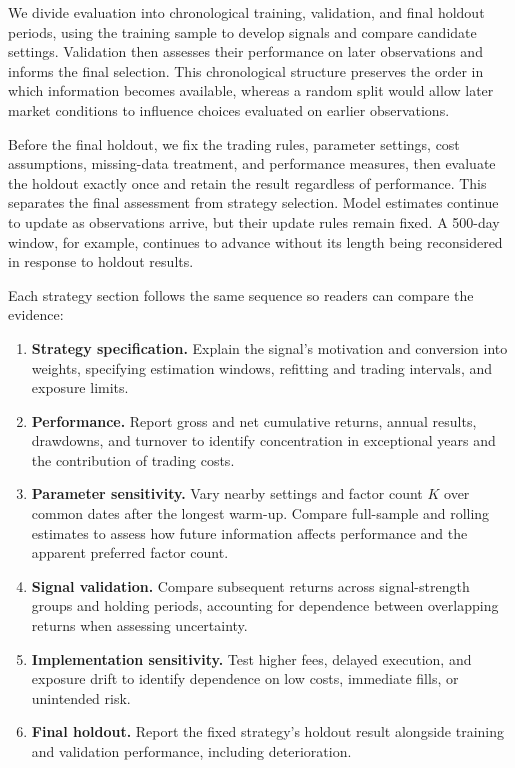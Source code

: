 We divide evaluation into chronological training, validation, and final
holdout periods, using the training sample to develop signals and compare
candidate settings. Validation then assesses their performance on later
observations and informs the final selection. This chronological structure
preserves the order in which information becomes available, whereas a
random split would allow later market conditions to influence choices
evaluated on earlier observations.

Before the final holdout, we fix the trading rules, parameter settings,
cost assumptions, missing-data treatment, and performance measures, then
evaluate the holdout exactly once and retain the result regardless of
performance. This separates the final assessment from strategy selection.
Model estimates continue to update as observations arrive, but their
update rules remain fixed. A 500-day window, for example, continues to
advance without its length being reconsidered in response to holdout
results.

Each strategy section follows the same sequence so readers can compare
the evidence:
\begin{enumerate}
    \item \textbf{Strategy specification.} Explain the signal's motivation
    and conversion into weights, specifying estimation windows, refitting
    and trading intervals, and exposure limits.
    \item \textbf{Performance.} Report gross and net cumulative returns,
    annual results, drawdowns, and turnover to identify concentration in
    exceptional years and the contribution of trading costs.
    \item \textbf{Parameter sensitivity.} Vary nearby settings and factor
    count \(K\) over common dates after the longest warm-up. Compare
    full-sample and rolling estimates to assess how future information
    affects performance and the apparent preferred factor count.
    \item \textbf{Signal validation.} Compare subsequent returns across
    signal-strength groups and holding periods, accounting for dependence
    between overlapping returns when assessing uncertainty.
    \item \textbf{Implementation sensitivity.} Test higher fees, delayed
    execution, and exposure drift to identify dependence on low costs,
    immediate fills, or unintended risk.
    \item \textbf{Final holdout.} Report the fixed strategy's holdout result
    alongside training and validation performance, including deterioration.
\end{enumerate}

